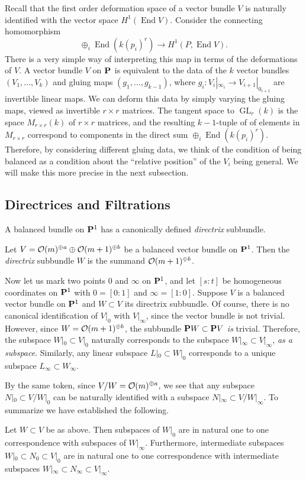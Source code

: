 \documentclass[11pt, two side, letterpaper, final]{amsart}
\renewcommand{\P}{{\bf P}}
\newcommand {\from}{\colon}
\DeclareMathOperator{\GL}{GL}
\DeclareMathOperator{\End}{End}
\newcommand{\chain}[1]{\P_{#1}}
\begin{document}
Recall that the first order deformation space of a vector bundle $V$ is naturally identified with the vector space $H^{1}(\End V)$.  Consider the connecting homomorphism  \[\oplus_{i} \End (k(p_{i})^{r}) \to H^{1}(P, \End V).\]  There is a very simple way of interpreting this map in terms of the deformations of $V$. A vector bundle $V$ on $\chain{}$ is equivalent to the data of the $k$ vector bundles $(V_{1},\ldots, V_{k})$ and gluing maps $(g_{1}, \ldots ,g_{k-1})$, where $g_{i} \from V_{i}|_{\infty_i} \to V_{i+1}|_{0_{i+1}}$ are invertible linear maps.  We can deform this data by simply varying the gluing maps, viewed as invertible $r \times r$ matrices.  The tangent space to $\GL_{r}(k)$ is the space $M_{r \times r}(k)$ of $r \times r$ matrices, and the resulting $k-1$-tuple of of elements in $M_{r \times r}$ correspond to components in the direct sum $\oplus_{i} \End (k(p_{i})^{r})$.  Therefore, by considering different gluing data, we think of the condition of being balanced as a condition about the ``relative position'' of the $V_{i}$ being general.  We will make this more precise in the next subsection.

\subsection{Directrices and Filtrations} A balanced bundle on $\P^1$ has a canonically defined \emph{directrix} subbundle. 
\begin{definition}
Let $V = {\mathcal O}(m)^{\oplus a} \oplus {\mathcal O}(m+1)^{\oplus b}$ be a balanced vector bundle on $\P^1$.  Then the \emph{directrix} subbundle $W$ is the summand ${\mathcal O}(m+1)^{\oplus b}$. 
\end{definition}

Now let us mark two points $0$ and $\infty$ on $\P^1$, and let $[s : t]$ be homogeneous coordinates on $\P^1$ with $0 = [0 :1]$ and $\infty = [1 :0 ]$. Suppose $V$ is a balanced vector bundle on $\P^1$ and $W \subset V$ its directrix subbundle. Of course, there is no canonical identification of $V|_{0}$ with $V|_{\infty}$, since the vector bundle is not trivial. 
However, since $W = {\mathcal O}(m+1)^{\oplus b}$, the subbundle $\P W \subset \P V$ \emph{is} trivial.
Therefore, the subspace $W|_{0} \subset V|_{0}$ naturally corresponds to the subspace $W|_{\infty} \subset V|_{\infty}$, \emph{as a subspace}.  Similarly, any linear subspace $L|_{0} \subset W|_{0}$ corresponds to a unique subspace $L_{\infty} \subset W_{\infty}$.

By the same token, since $V/W = {\mathcal O}(m)^{\oplus a}$, we see that any subspace $N|_{0} \subset V/W|_{0}$ can be naturally identified with a subspace $N|_{\infty} \subset V/W|_{\infty}$.  To summarize we have established the following.
\begin{lemma}\label{transport}
Let $W \subset V$ be as above.  Then subspaces of $W|_{0}$ are in natural one to one correspondence with subspaces of $W|_{\infty}$.  Furthermore, intermediate subspaces $W|_{0} \subset N_{0} \subset V|_{0}$ are in natural one to one correspondence with intermediate subspaces $W|_{\infty} \subset N_{\infty} \subset V|_{\infty}.$
\end{lemma}
\end{document}
